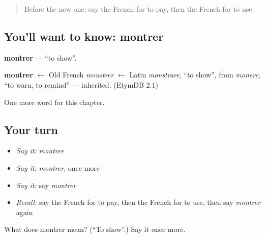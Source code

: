 \label{lesson:FR-C62-montrer}



\begin{quote}
Before the new one: say the French for to pay, then the French for to use.
\end{quote}

\subsection*{You'll want to know: montrer}
\textbf{montrer} — \textquotedblleft{}to show\textquotedblright{}.

\begin{cousinweb}
\textbf{montrer} $\leftarrow$ Old French \emph{monstrer} $\leftarrow$ Latin \emph{monstrare}, \textquotedblleft{}to show\textquotedblright{}, from \emph{monere}, \textquotedblleft{}to warn, to remind\textquotedblright{} — inherited. (EtymDB 2.1)
\end{cousinweb}

\begin{grammarlens}[title={What you've built}]
One more word for this chapter.
\end{grammarlens}

\subsection*{Your turn}
\begin{itemize}
\raggedright
  \item \emph{Say it:} \emph{montrer}
  \item \emph{Say it:} \emph{montrer}, once more
  \item \emph{Say it:} say \emph{montrer}
  \item \emph{Recall:} say the French for to pay, then the French for to use, then say \emph{montrer} again
\end{itemize}

\begin{tcolorbox}[breakable,colback=teal!4,colframe=teal!35!black,title={Before you move on}]
What does montrer mean? (\textquotedblleft{}To show\textquotedblright{}.) Say it once more.
\end{tcolorbox}
